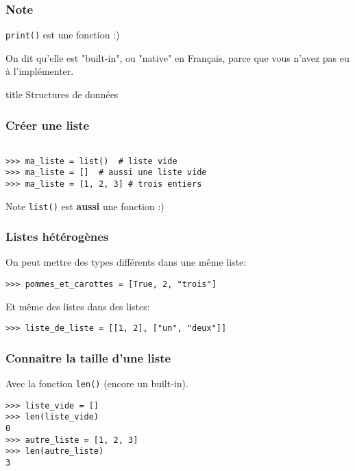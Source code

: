 \documentclass{beamer}
\begin{document}
\begin{frame}[fragile]
  \frametitle{Note}
\texttt{print()} est une fonction :)

\vfill

On dit qu'elle est "built-in", ou "native" en Français,
parce que vous n'avez pas eu à l'implémenter.

\end{frame}


\begin{frame}[fragile]
  \begin{beamercolorbox}[sep=8pt,center,shadow=true,rounded=true]{title}
    Structures de données
  \end{beamercolorbox}
\end{frame}

\begin{frame}[fragile]
  \frametitle{Créer une liste}
\begin{lstlisting}

>>> ma_liste = list()  # liste vide
>>> ma_liste = []  # aussi une liste vide
>>> ma_liste = [1, 2, 3] # trois entiers

\end{lstlisting}

\vfill

\begin{alertblock}{Note}
  \texttt{list()} est \textbf{aussi} une fonction :)
\end{alertblock}

\end{frame}

\begin{frame}[fragile]
  \frametitle{Listes hétérogènes}

On peut mettre des types différents dans une même liste:

\begin{lstlisting}
>>> pommes_et_carottes = [True, 2, "trois"]
\end{lstlisting}

\vfill
Et même des listes dans des listes:

\begin{lstlisting}
>>> liste_de_liste = [[1, 2], ["un", "deux"]]
\end{lstlisting}


\end{frame}


\begin{frame}[fragile]
  \frametitle{Connaître la taille d'une liste}
Avec la fonction \texttt{len()} (encore un built-in).

\vfill

\begin{lstlisting}
>>> liste_vide = []
>>> len(liste_vide)
0
>>> autre_liste = [1, 2, 3]
>>> len(autre_liste)
3
\end{lstlisting}

\end{frame}
\end{document}
